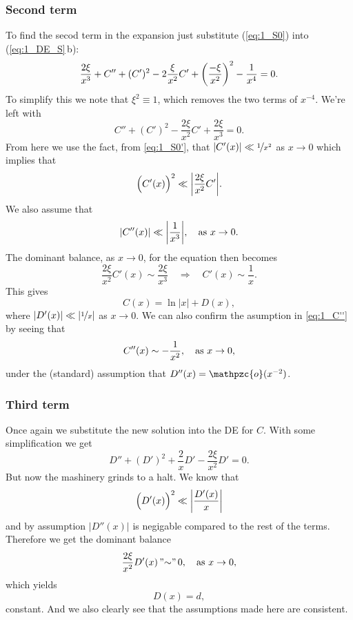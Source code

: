 \documentclass[11pt,letter, swedish, english
]{article}
\newcommand{\oh}{\ensuremath\mathpzc{o}}
\newcommand{\as}{\qcomma\text{as }}
\begin{document}
\subsubsection{Second term}
To find the secod term in the expansion just substitute
(\ref{eq:1_S0}) into (\ref{eq:1_DE_S}\,b):
\begin{equation}
\frac{2\xi}{x^3}+C''
+(C')^2-2\frac{\xi}{x^2}C' + \qty(\frac{-\xi}{x^2})^2
-\frac{1}{x^4}=0.
\end{equation}
To simplify this we note that $\xi^2\equiv1$, which removes the two
terms of $x^{-4}$. We're left with
\begin{equation}
C''+(C')^2-\frac{2\xi}{x^2}C' + \frac{2\xi}{x^3} = 0.
\end{equation}
From here we use the fact, from \eqref{eq:1_S0'}, that
$|C'(x)|\ll\nicefrac{1}{x^2}$ as $x\to0$ which implies that
\begin{equation}
\Big(C'(x)\Big)^2\ll\abs{\frac{2\xi}{x^2}C'}.
\end{equation}
We also assume that
\begin{equation}\label{eq:1_C''}
\abs{C''(x)}\ll\abs{\frac{1}{x^3}}\as x\to0.
\end{equation}
The dominant balance, as $x\to0$, for the equation then becomes
\begin{equation}
\frac{2\xi}{x^2}C'(x) \sim \frac{2\xi}{x^3}
\quad\Longrightarrow\quad
C'(x)\sim\frac{1}{x}.
\end{equation}
This gives 
\begin{equation}
C(x)=\ln|x|+D(x),
\end{equation}
where $|D'(x)|\ll|\nicefrac{1}{x}|$ as $x\to0$. We can also confirm the
asumption in \eqref{eq:1_C''} by seeing that
\begin{equation}
C''(x)\sim -\frac{1}{x^2}\as x\to0,
\end{equation}
under the (standard) assumption that $D''(x)=\oh(x^{-2})$.

\subsubsection{Third term}
Once again we substitute the new solution into the DE for $C$. With
some simplification we get
\begin{equation}
D''+(D')^2+\frac{2}{x}D' - \frac{2\xi}{x^2}D'=0.
\end{equation}
But now the mashinery grinds to a halt. We know that 
\begin{equation}
\Big(D'(x)\Big)^2\ll\abs{\frac{D'(x)}{x}}
\end{equation}
and by assumption $|D''(x)|$ is negigable compared to the rest of the
terms. Therefore we get the dominant balance
\begin{equation}
\frac{2\xi}{x^2}D'(x) \,"{\sim}"\, 0\as x\to0,
\end{equation}
which yields
\begin{equation}
D(x)=d,
\end{equation}
constant. And we also clearly see that the assumptions made here are
consistent.
\end{document}
